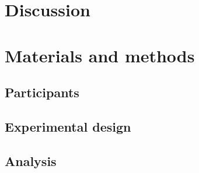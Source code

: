 \documentclass[10pt]{article}
\begin{document}







\section*{Discussion}





\section*{Materials and methods}
\subsection*{Participants}

\subsection*{Experimental design}

\subsection*{Analysis}



\end{document}
